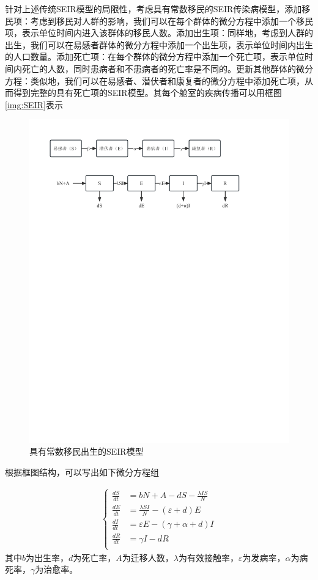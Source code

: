 针对上述传统SEIR模型的局限性，考虑具有常数移民的SEIR传染病模型，添加移民项：考虑到移民对人群的影响，我们可以在每个群体的微分方程中添加一个移民项，表示单位时间内进入该群体的移民人数。添加出生项：同样地，考虑到人群的出生，我们可以在易感者群体的微分方程中添加一个出生项，表示单位时间内出生的人口数量。添加死亡项：在每个群体的微分方程中添加一个死亡项，表示单位时间内死亡的人数，同时患病者和不患病者的死亡率是不同的。更新其他群体的微分方程：类似地，我们可以在易感者、潜伏者和康复者的微分方程中添加死亡项，从而得到完整的具有死亡项的SEIR模型。其每个舱室的疾病传播可以用框图\ref{img:SEIR}表示

\begin{figure}[htbp]
    \centering
    \includegraphics{image/NewSEIR}
    \caption{具有常数移民出生的SEIR模型}
    \label{img:NewSEIR}
\end{figure} 

根据框图结构，可以写出如下微分方程组

\begin{gather}
    \left\{
    \begin{aligned}
    \frac{dS}{dt} & =  bN + A-dS-\frac{\lambda IS}{N} \\
    \frac{dE}{dt} & =  \frac{\lambda SI}{N} - (\varepsilon +d)E\\
    \frac{dI}{dt} & =  \varepsilon E - (\gamma +\alpha +d)I\\
    \frac{dR}{dt} & =  \gamma I - dR \\
    \end{aligned}
    \right.
    \label{equal:NewSEIR}
\end{gather}
其中$b$为出生率，$d$为死亡率，$A$为迁移人数，$\lambda$为有效接触率，$\varepsilon$为发病率，$\alpha$为病死率，$\gamma$为治愈率。

